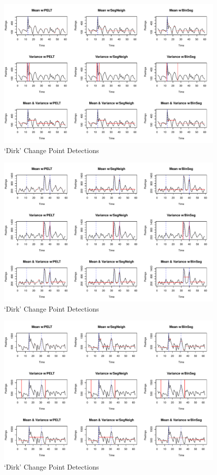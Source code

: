 \documentclass[../main.tex]{subfiles}
\begin{document}
\begin{figure}[h]
    \includegraphics[width=\textwidth]{figures/kvkresults}
    \caption{`Dirk' Change Point Detections}
    \label{fig:kvk}
\end{figure}

\begin{figure}[h]
    \includegraphics[width=\textwidth]{figures/rabobankresults}
    \caption{`Dirk' Change Point Detections}
    \label{fig:rabobank}
\end{figure}


\begin{figure}[h]
    \includegraphics[width=\textwidth]{figures/tele2results}
    \caption{`Dirk' Change Point Detections}
    \label{fig:tele2}
\end{figure}
\end{document}
